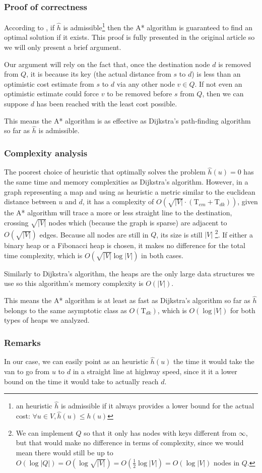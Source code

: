 \subsubsection{Proof of correctness}
According to \cite{Astar}, if $\hat{h}$ is admissible\footnote{an heuristic $\hat{h}$ is admissible if it always provides a lower bound for the actual cost: $\forall u \in V, \hat{h}(u) \leq h(u)$} then the A* algorithm is guaranteed to find an optimal solution if it exists. This proof is fully presented in the original article so we will only present a brief argument.\par
Our argument will rely on the fact that, once the destination node $d$ is removed from $Q$, it is because its key (the actual distance from $s$ to $d$) is less than an optimistic cost estimate from $s$ to $d$ via any other node $v \in Q$. If not even an optimistic estimate could force $v$ to be removed before $s$ from $Q$, then we can suppose $d$ has been reached with the least cost possible.\par
This means the A* algorithm is as effective as Dijkstra's path-finding algorithm so far as $\hat{h}$ is admissible.
\subsubsection{Complexity analysis}
The poorest choice of heuristic that optimally solves the problem $\hat{h}(u)=0$ has the same time and memory complexities as Dijkstra's algorithm. However, in a graph representing a map and using as heuristic a metric similar to the euclidean distance between $u$ and $d$, it has a complexity of $O(\sqrt{|V|} \cdot (\text{T}_{em}+\text{T}_{dk}))$, given the A* algorithm will trace a more or less straight line to the destination, crossing $\sqrt{|V|}$ nodes which (because the graph is sparse) are adjacent to $O(\sqrt{|V|})$ edges. Because all nodes are still in $Q$, its size is still $|V|$ \footnote{We can implement $Q$ so that it only has nodes with keys different from $\infty$, but that would make no difference in terms of complexity, since we would mean there would still be up to $O(\log |Q|)=O(\log \sqrt{|V|})=O(\frac{1}{2}\log |V|)=O(\log |V|)$ nodes in $Q$.}.
If either a binary heap or a Fibonacci heap is chosen, it makes no difference for the total time complexity, which is $O(\sqrt{|V|} \log |V|)$ in both cases.\par
Similarly to Dijkstra's algorithm, the heaps are the only large data structures we use so this algorithm's memory complexity is $O(|V|)$.\par
This means the A* algorithm is at least as fast as Dijkstra's algorithm so far as $\hat{h}$ belongs to the same asymptotic class as $O(\text{T}_{dk})$, which is $O(\log |V|)$ for both types of heaps we analyzed.
\subsubsection{Remarks}
In our case, we can easily point as an heuristic $\hat{h}(u)$ the time it would take the van to go from $u$ to $d$ in a straight line at highway speed, since it it a lower bound on the time it would take to actually reach $d$.
